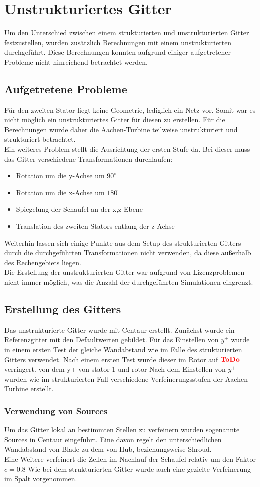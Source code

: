 \section{Unstrukturiertes Gitter}
Um den Unterschied zwischen einem strukturierten und unstrukturierten Gitter festzustellen, wurden zusätzlich Berechnungen mit einem unstrukturierten durchgeführt. Diese Berechnungen konnten aufgrund einiger aufgetretener Probleme nicht hinreichend betrachtet werden.

\subsection{Aufgetretene Probleme}
Für den zweiten Stator liegt keine Geometrie, lediglich ein Netz vor. Somit war es nicht möglich ein unstrukturiertes Gitter für diesen zu erstellen. Für die Berechnungen wurde daher die Aachen-Turbine teilweise unstrukturiert und strukturiert betrachtet.\\
Ein weiteres Problem stellt die Ausrichtung der ersten Stufe da.
Bei dieser muss das Gitter verschiedene Transformationen durchlaufen:
\begin{itemize}
\item Rotation um die y-Achse um $90^\circ$
\item Rotation um die x-Achse um $180^\circ$
\item Spiegelung der Schaufel an der x,z-Ebene
\item Translation des zweiten Stators entlang der z-Achse
\end{itemize}
Weiterhin lassen sich einige Punkte aus dem Setup des strukturierten Gitters durch die durchgeführten Transformationen nicht verwenden, da diese außerhalb des Rechengebiets liegen.\\
Die Erstellung der unstrukturierten Gitter war aufgrund von Lizenzproblemen nicht immer möglich, was die Anzahl der durchgeführten Simulationen eingrenzt.
\subsection{Erstellung des Gitters}
Das unstrukturierte Gitter wurde mit Centaur erstellt. Zunächst wurde ein Referenzgitter mit den Defaultwerten gebildet. Für das Einstellen von $y^+$ wurde in einem ersten Test der gleiche Wandabstand wie im Falle des strukturierten Gitters verwendet. Nach einem ersten Test wurde dieser im Rotor auf $\textcolor{red}{\textbf{ToDo}}$ verringert.
\image von dem y+ von stator 1 und rotor
Nach dem Einstellen von $y^+$ wurden wie im strukturierten Fall verschiedene Verfeinerungsstufen der Aachen-Turbine erstellt.
\tabelle
\subsubsection{Verwendung von Sources}
Um das Gitter lokal an bestimmten Stellen zu verfeinern wurden sogenannte Sources in Centaur eingeführt.
Eine davon regelt den unterschiedlichen Wandabstand von Blade zu dem von Hub, beziehungsweise Shroud.\\
Eine Weitere verfeinert die Zellen im Nachlauf der Schaufel relativ um den Faktor $c = 0.8$
\image
Wie bei dem strukturierten Gitter wurde auch eine gezielte Verfeinerung im Spalt vorgenommen.